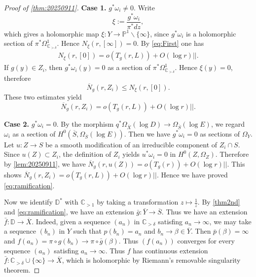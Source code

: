 \documentclass[11pt,english]{smfart}
\theoremstyle{plain}
\theoremstyle{definition}
\theoremstyle{remark}
\numberwithin{equation}{section}
\theoremstyle{plain}
\newcommand{\bC}{\mathbb{C}}
\newcommand{\bD}{\mathbb{D}}
\newcommand{\bP}{\mathbb{P}}
\begin{document}
\begin{proof}[Proof of \cref{thm:20250911}]
	
	\textbf{Case 1.} 
	$g^*\omega_i\neq 0$.
Write
	$$
	\xi:=\frac{ g^*\omega_i}{\pi^*dz},
	$$   
	which gives a holomorphic map $\xi:Y\to  \bP^1\backslash\{\infty\}$, since $g^*\omega_i$ is a holomorphic section of $\pi^*\Omega^1_{\mathbb C_{>\delta}}$. 
Hence $N_{\xi}(r,[\infty])=0$.
By \eqref{eq:First} one has 
	\begin{align*} 
		N_{\xi}(r,[0])= o(T_{g}(r, L))+O(\log r)||.
	\end{align*}
If $g(y)\in Z_{i}$, then $g^*\omega_i(y)=0$ as a section of $\pi^*\Omega^1_{\mathbb C_{>\delta}}$.
Hence $\xi(y)=0$, therefore
	 $$
	 \overline{N}_g(r, Z_{i})\leq N_{\xi}(r,[0]).
	 $$
These two estimates yield
	$$
	\overline{N}_g(r, Z_{i})= o(T_{g}(r, L))+O(\log r)||.
	$$

	
	\textbf{Case 2.} 
	$g^*\omega_i= 0$.
	By the morphism $q^*\Omega_{\overline{X}}(\log D)\to \Omega_{\overline{S}}(\log E)$, we regard $\omega_i$ as a section of $H^0(\overline{S},\Omega_{\overline{S}}(\log E))$.
	Then we have $g^*\omega_i= 0$ as sections of $\Omega_{Y}$.
	Let $u:Z\to S$ be a smooth modification of an irreducible component of $Z_{i}\cap S$.
	Since $u(Z)\subset Z_{i}$, the definition of $Z_i$ yields $u^*\omega_i=0$ in $H^0(Z,\Omega_Z)$.
	Therefore by \cref{lem:20250911}, we have $\overline{N}_g(r,  u(Z))= o(T_{g}(r))+O(\log r)||$.
This shows $\overline{N}_g(r,  Z_{i})= o(T_{g}(r, L))+O(\log r)||$. 	
	Hence we have proved \eqref{eq:ramification}.
	
	
	Now we identify $\bD^*$ with $\bC_{>1}$  by taking a transformation $z\mapsto\frac{1}{z}$.
	By \cref{thm2nd} and \eqref{eq:ramification}, we have an extension $\bar{g}:\bar{Y}\to\overline{S}$.
	Thus we have an extension $\bar{f}:\mathbb D\to\overline{X}$.
	Indeed, given a sequence $(a_n)$ in $\mathbb C_{>\delta}$ satisfing $a_n\to\infty$, we may take a sequence $(b_n)$ in $Y$ such that $p(b_n)=a_n$ and $b_n\to \beta\in \overline{Y}$.
Then $\bar{p}(\beta)=\infty$ and $f(a_n)=\pi\circ g(b_n)\to \pi\circ \bar{g}(\beta)$.
Thus $(f(a_n))$ converges for every sequence $(a_n)$ satisfing $a_n\to\infty$.
Thus $f$ has continuous extension $\bar{f}:\mathbb C_{>\delta}\cup\{\infty\}\to \overline{X}$, which is holomorphic by Riemann's removable singularity theorem.
\end{proof}





	
	
	
	
	
	
\end{document}
